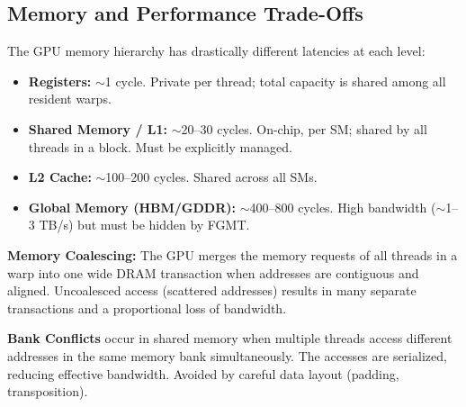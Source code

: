 \subsection{Memory and Performance Trade-Offs}

\begin{remark}
    The GPU memory hierarchy has drastically different latencies at each level:
    \begin{itemize}
        \item \textbf{Registers:} $\sim$1 cycle. Private per thread; total capacity is shared among all resident warps.
        \item \textbf{Shared Memory / L1:} $\sim$20--30 cycles. On-chip, per SM; shared by all threads in a block. Must be explicitly managed.
        \item \textbf{L2 Cache:} $\sim$100--200 cycles. Shared across all SMs.
        \item \textbf{Global Memory (HBM/GDDR):} $\sim$400--800 cycles. High bandwidth ($\sim$1--3 TB/s) but must be hidden by FGMT.
    \end{itemize}
\end{remark}

\begin{definition}
    \textbf{Memory Coalescing:} The GPU merges the memory requests of all threads in a warp into one wide DRAM transaction when addresses are contiguous and aligned. Uncoalesced access (scattered addresses) results in many separate transactions and a proportional loss of bandwidth.
\end{definition}

\begin{definition}
    \textbf{Bank Conflicts} occur in shared memory when multiple threads access different addresses in the same memory bank simultaneously. The accesses are serialized, reducing effective bandwidth. Avoided by careful data layout (padding, transposition).
\end{definition}
